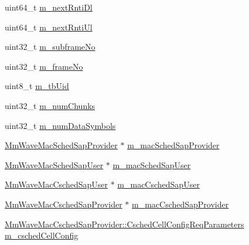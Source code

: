 \begin{DoxyCompactItemize}
\item 
uint64\+\_\+t \hyperlink{classns3_1_1MmWaveFlexTtiMaxRateMacScheduler_a40b653a664a7071595e9d8529309f765}{m\+\_\+next\+Rnti\+Dl}
\item 
uint64\+\_\+t \hyperlink{classns3_1_1MmWaveFlexTtiMaxRateMacScheduler_af31b2833133e5cb607db2df25a649305}{m\+\_\+next\+Rnti\+Ul}
\item 
uint32\+\_\+t \hyperlink{classns3_1_1MmWaveFlexTtiMaxRateMacScheduler_a3a2ccfc2cee92e9b7ee8f32637f13777}{m\+\_\+subframe\+No}
\item 
uint32\+\_\+t \hyperlink{classns3_1_1MmWaveFlexTtiMaxRateMacScheduler_a70d58e7687111de70ffb85325f562618}{m\+\_\+frame\+No}
\item 
uint8\+\_\+t \hyperlink{classns3_1_1MmWaveFlexTtiMaxRateMacScheduler_a24a4bdb5698dbeaccb6afc572b39f691}{m\+\_\+tb\+Uid}
\item 
uint32\+\_\+t \hyperlink{classns3_1_1MmWaveFlexTtiMaxRateMacScheduler_a1196b9c7a626b46bbdbbe0742f8efa54}{m\+\_\+num\+Chunks}
\item 
uint32\+\_\+t \hyperlink{classns3_1_1MmWaveFlexTtiMaxRateMacScheduler_a031f3d092f900947acaaa465bf5d9471}{m\+\_\+num\+Data\+Symbols}
\item 
\hyperlink{classns3_1_1MmWaveMacSchedSapProvider}{Mm\+Wave\+Mac\+Sched\+Sap\+Provider} $\ast$ \hyperlink{classns3_1_1MmWaveFlexTtiMaxRateMacScheduler_acf594eb555aa5a6fad9437df6d5aabc2}{m\+\_\+mac\+Sched\+Sap\+Provider}
\item 
\hyperlink{classns3_1_1MmWaveMacSchedSapUser}{Mm\+Wave\+Mac\+Sched\+Sap\+User} $\ast$ \hyperlink{classns3_1_1MmWaveFlexTtiMaxRateMacScheduler_a5cbf24eeaf560ea4a132bf967e80f817}{m\+\_\+mac\+Sched\+Sap\+User}
\item 
\hyperlink{classns3_1_1MmWaveMacCschedSapUser}{Mm\+Wave\+Mac\+Csched\+Sap\+User} $\ast$ \hyperlink{classns3_1_1MmWaveFlexTtiMaxRateMacScheduler_aec58fbdd76e0ef99cf77e6b0632045ff}{m\+\_\+mac\+Csched\+Sap\+User}
\item 
\hyperlink{classns3_1_1MmWaveMacCschedSapProvider}{Mm\+Wave\+Mac\+Csched\+Sap\+Provider} $\ast$ \hyperlink{classns3_1_1MmWaveFlexTtiMaxRateMacScheduler_a97ada1c6d19e453f0626eb6a25891bef}{m\+\_\+mac\+Csched\+Sap\+Provider}
\item 
\hyperlink{structns3_1_1MmWaveMacCschedSapProvider_1_1CschedCellConfigReqParameters}{Mm\+Wave\+Mac\+Csched\+Sap\+Provider\+::\+Csched\+Cell\+Config\+Req\+Parameters} \hyperlink{classns3_1_1MmWaveFlexTtiMaxRateMacScheduler_ad98e61aaf52785c3517d5811e4b58317}{m\+\_\+csched\+Cell\+Config}
\item 

\end{DoxyCompactItemize}
